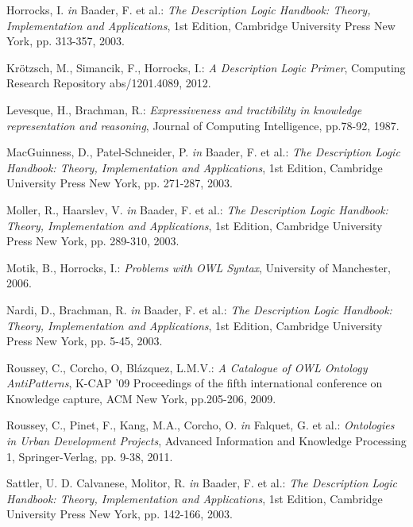 \documentclass[titlepage,a4paper,12pt,oneside]{book}
\begin{document}
\begin{thebibliography}{99}
  Horrocks, I. \textit{in} Baader, F. et al.:
  \textit{The Description Logic Handbook: Theory, Implementation and Applications},
  1st Edition,
  Cambridge University Press New York,
  pp. 313-357,
  2003.

  Krötzsch, M., Simancik, F., Horrocks, I.: 
  \textit{A Description Logic Primer},
  Computing Research Repository abs/1201.4089,
  2012.

  Levesque, H., Brachman, R.:
  \textit{Expressiveness and tractibility in knowledge representation and reasoning},
  Journal of Computing Intelligence,
  pp.78-92,
  1987.

  MacGuinness, D., Patel-Schneider, P. \textit{in} Baader, F. et al.:
  \textit{The Description Logic Handbook: Theory, Implementation and Applications},
  1st Edition,
  Cambridge University Press New York,
  pp. 271-287,
  2003.

  Moller, R., Haarslev, V. \textit{in} Baader, F. et al.:
  \textit{The Description Logic Handbook: Theory, Implementation and Applications},
  1st Edition,
  Cambridge University Press New York,
  pp. 289-310,
  2003.

  Motik, B., Horrocks, I.:
  \textit{Problems with OWL Syntax},
  University of Manchester,
  2006.

  Nardi, D., Brachman, R. \textit{in} Baader, F. et al.:
  \textit{The Description Logic Handbook: Theory, Implementation and Applications},
  1st Edition,
  Cambridge University Press New York,
  pp. 5-45,
  2003.

  Roussey, C., Corcho, O, Blázquez, L.M.V.: 
  \textit{A Catalogue of OWL Ontology AntiPatterns},
  K-CAP '09 Proceedings of the fifth international conference on Knowledge capture,
  ACM New York,
  pp.205-206,
  2009.

  Roussey, C., Pinet, F., Kang, M.A., Corcho, O. \textit{in} Falquet, G. et al.:
  \textit{Ontologies in Urban Development Projects},
  Advanced Information and Knowledge Processing 1,
  Springer-Verlag,
  pp. 9-38,
  2011.

  Sattler, U. D. Calvanese, Molitor, R. \textit{in} Baader, F. et al.:
  \textit{The Description Logic Handbook: Theory, Implementation and Applications},
  1st Edition,
  Cambridge University Press New York,
  pp. 142-166,
  2003.


\end{thebibliography}
\end{document}
